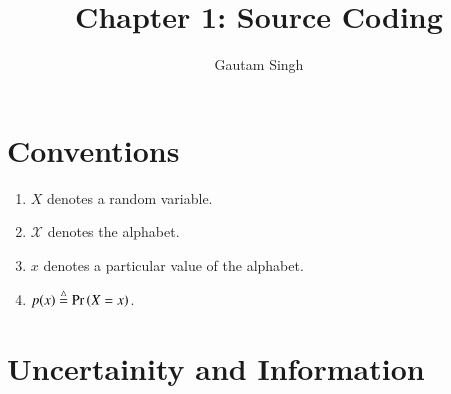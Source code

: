 \documentclass[journal,12pt,twocolumn]{IEEEtran}
\renewcommand\thesection{\arabic{section}}
\begin{document}
\vspace{3cm}
\title{Chapter 1: Source Coding}
\author{Gautam Singh}
\maketitle
\bigskip

\section{Conventions}

\begin{enumerate}[label=\thesection.\arabic*, ref=\thesection.\theenumi]
    \item $X$ denotes a random variable.
    \item $\mathcal{X}$ denotes the alphabet.
    \item $x$ denotes a particular value of the alphabet.
    \item $p(x) \stackrel{\triangle}{=} \Pr\left(X = x\right)$.
\end{enumerate}

\section{Uncertainity and Information}
\end{document}

